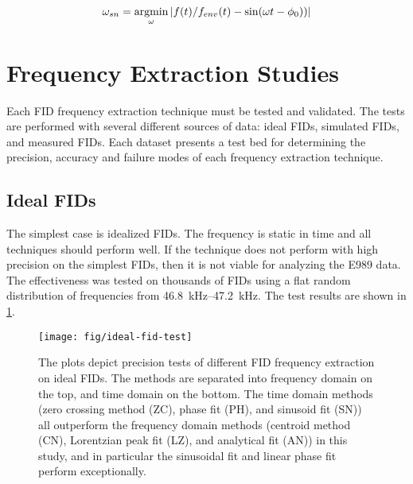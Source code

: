 \begin{equation}
\label{eqn:freq-sn}
\omega_{sn} = \operatorname*{argmin}_\omega \; \\
\lvert f(t) / f_{env}(t) - \sin(\omega t - \phi_0)) \rvert
\end{equation}

\section{Frequency Extraction Studies}

Each FID frequency extraction technique must be tested and validated.  The tests are performed with several different sources of data: ideal FIDs, simulated FIDs, and measured FIDs.  Each dataset presents a test bed for determining the precision, accuracy and failure modes of each frequency extraction technique.

\subsection{Ideal FIDs}
The simplest case is idealized FIDs. The frequency is static in time and all techniques should perform well.  If the technique does not perform with high precision on the simplest FIDs, then it is not viable for analyzing the E989 data.  The effectiveness was tested on thousands of FIDs using a flat random distribution of frequencies from \SIrange{46.8}{47.2}{\kHz}.  The test results are shown in \ref{fig:fid-ideal-freq-extraction}.

\begin{figure}
\centering
\texttt{[image: fig/ideal-fid-test]}
\caption{
    The plots depict precision tests of different FID frequency extraction on ideal FIDs.  The methods are separated into frequency domain on the top, and time domain on the bottom.  The time domain methods (zero crossing method (ZC), phase fit (PH), and sinusoid fit (SN)) all outperform the frequency domain methods (centroid method (CN), Lorentzian peak fit (LZ), and analytical fit (AN)) in this study, and in particular the sinusoidal fit and linear phase fit perform exceptionally.
    \label{fig:fid-ideal-freq-extraction}
}
\end{figure}

